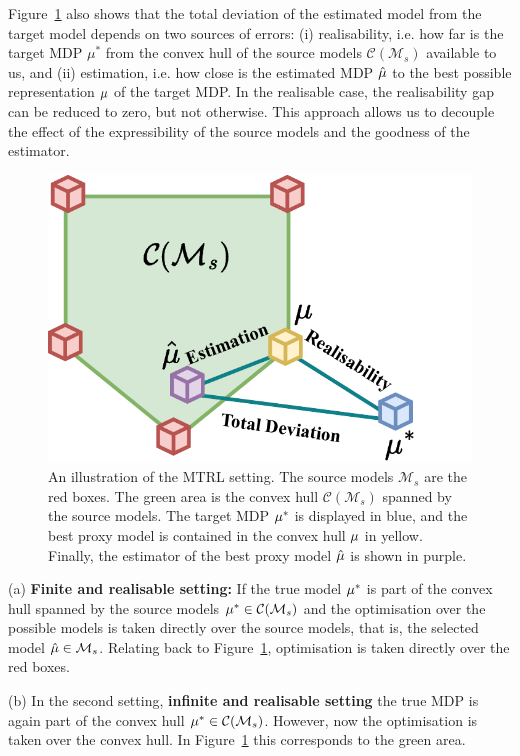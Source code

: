 Figure~\ref{fig:trl} also shows that the total deviation of the estimated model from the target model depends on two sources of errors: (i) realisability, i.e. how far is the target MDP $\mu^*$ from the convex hull of the source models $\mathcal{C}(\mathcal{M}_s)$ available to us, and (ii) estimation, i.e. how close is the estimated MDP $\hat{\mu}$ to the best possible representation $\mu$ of the target MDP. In the realisable case, the realisability gap can be reduced to zero, but not otherwise. This approach allows us to decouple the effect of the expressibility of the source models and the goodness of the estimator.
\setlength{\textfloatsep}{4pt}%
\begin{figure}
    \centering
    \includegraphics[width=0.35\paperwidth]{img/TRL.pdf}
    \caption{An illustration of the MTRL setting. The source models $\mathcal{M}_s$ are the red boxes. The green area is the convex hull $\mathcal{C}(\mathcal{M}_s)$ spanned by the source models. The target MDP $\mu^{*}$ is displayed in blue, and the best proxy model is contained in the convex hull $\mu$ in yellow. Finally, the estimator of the best proxy model $\hat{\mu}$ is shown in purple.}
    \label{fig:trl}
\end{figure}
\iffalse
(a) \textbf{Finite and realisable setting:}  If the true model $\mu^{*}$ is part of the convex hull spanned by the source models $\mu^{*} \in \mathcal{C}(\mathcal{M}_s)$ and the optimisation over the possible models is taken directly over the source models, that is, the selected model $\hat{\mu} \in \mathcal{M}_s$. Relating back to Figure~\ref{fig:trl}, optimisation is taken directly over the red boxes. 

(b) In the second setting, \textbf{infinite and realisable setting} the true MDP is again part of the convex hull $\mu^{*} \in \mathcal{C}(\mathcal{M}_s)$. However, now the optimisation is taken over the convex hull. In Figure~\ref{fig:trl} this corresponds to the green area. 

